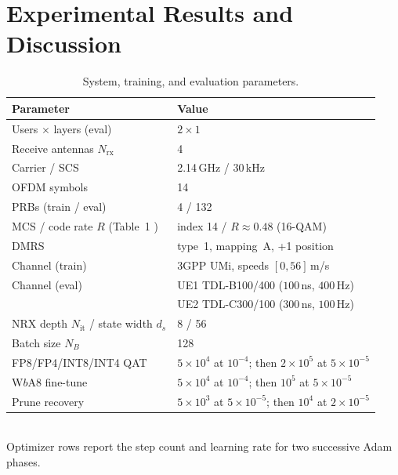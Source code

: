 %

\section{Experimental Results and Discussion}
\label{sec:results}

\begin{table}[t]
\centering
\caption{System, training, and evaluation parameters.}
\label{tab:sim_params}
\footnotesize
\setlength{\tabcolsep}{3pt}
\begin{tabular}{@{}p{}p{}@{}}
\toprule
Parameter & Value \\
\midrule
Users $\times$ layers (eval) & $2\times1$ \\
Receive antennas $N_{\mathrm{rx}}$ & 4 \\
Carrier / SCS & 2.14\,GHz / 30\,kHz \\
OFDM symbols & 14 \\
PRBs (train / eval) & 4 / 132 \\
MCS / code rate $R$ (Table~1 \cite{3gpp38214})
  & index 14 / $R\approx0.48$ (16-QAM) \\
DMRS & type~1, mapping~A, +1 position \\
Channel (train) & 3GPP UMi, speeds $[0,56]$\,m/s \\
Channel (eval) & UE1 TDL-B100/400 ($100$\,ns, $400$\,Hz) \cite{scamnrx} \\
 & UE2 TDL-C300/100 ($300$\,ns, $100$\,Hz) \\
NRX depth $N_{\mathrm{it}}$ / state width $d_s$ & 8 / 56 \\
Batch size $N_B$ & 128 \\
FP8/FP4/INT8/INT4 QAT & $5{\times}10^{4}$ at $10^{-4}$; then $2{\times}10^{5}$ at $5{\times}10^{-5}$ \\
W$b$A8 fine-tune & $5{\times}10^{4}$ at $10^{-4}$; then $10^{5}$ at $5{\times}10^{-5}$ \\
Prune recovery & $5{\times}10^{3}$ at $5{\times}10^{-5}$; then $10^{4}$ at $2{\times}10^{-5}$ \\
\bottomrule
\end{tabular}\\[2pt]
{\scriptsize Optimizer rows report the step count and learning rate for two successive Adam phases.}
\end{table}

